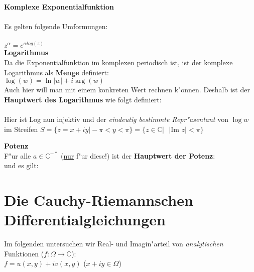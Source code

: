 \textbf{Komplexe Exponentialfunktion}\\
\\
Es gelten folgende Umformungen:\\
\\
$z ^\alpha = e^{\alpha log(z)}$\\					
\textbf{Logarithmus}\\
Da die Exponentialfunktion im komplexen periodisch ist, ist der komplexe Logarithmus als \textbf{Menge} definiert:\\
 \hspace{1cm} $\log(w) = \ln\vert w \vert + i \arg(w) $\\
Auch hier will man mit einem konkreten Wert rechnen k"onnen. Deshalb ist der \textbf{Hauptwert des Logarithmus} wie
folgt definiert:\\
\\
Hier ist Log nun injektiv und der \emph{eindeutig bestimmte Repr"asentant} von $\log w$ im Streifen
$S = \lbrace z=x+iy \vert - \pi < y < \pi \rbrace = \lbrace z \in \mathbb{C} \vert \text{ } \vert \text{Im }z \vert < \pi \rbrace $ 

\textbf{Potenz}\\
F"ur alle $a \in \mathbb{C}^{-*}$ (\underline{nur} f"ur diese!) ist der \textbf{Hauptwert der Potenz}:\\
 und es gilt: 

\section{Die Cauchy-Riemannschen Differentialgleichungen}
Im folgenden untersuchen wir Real- und Imagin"arteil von \emph{analytischen} Funktionen ($f: \Omega \to \mathbb{C}$):\\
$ f = u(x,y) + i v(x,y) $ ($x+iy \in \Omega$)

